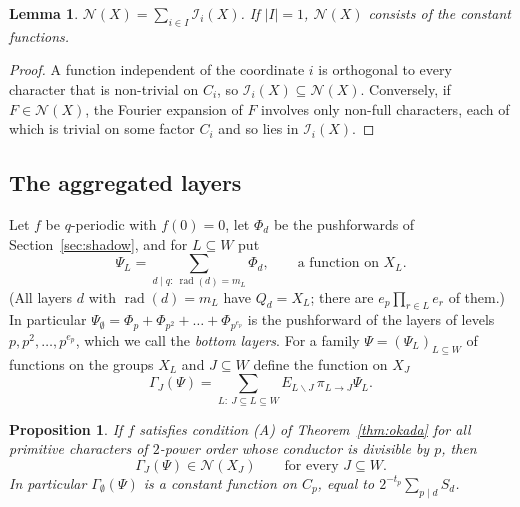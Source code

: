 \documentclass[11pt]{amsart}
\newtheorem{lemma}[theorem]{Lemma}
\newtheorem{proposition}[theorem]{Proposition}
\theoremstyle{definition}
\theoremstyle{remark}
\newcommand{\Nn}{\mathcal N}
\DeclareMathOperator{\rad}{rad}
\numberwithin{equation}{section}
\begin{document}
\begin{lemma}\label{lem:N}
$\Nn(X)=\sum_{i\in I}\mathcal I_i(X)$.
If $|I|=1$, $\Nn(X)$ consists of the constant functions.
\end{lemma}

\begin{proof}
A function independent of the coordinate $i$ is orthogonal to every character that is non-trivial on $C_i$, so $\mathcal I_i(X)\subseteq\Nn(X)$.
Conversely, if $F\in\Nn(X)$, the Fourier expansion of $F$ involves only non-full characters, each of which is trivial on some factor $C_i$ and so lies in $\mathcal I_i(X)$.
\end{proof}

\subsection{The aggregated layers}
Let $f$ be $q$-periodic with $f(0)=0$, let $\Phi_d$ be the pushforwards of Section~\ref{sec:shadow}, and for $L\subseteq W$ put
\[
\Psi_L=\sum_{d\mid q:\ \rad(d)=m_L}\Phi_d,\qquad\text{a function on }X_L .
\]
(All layers $d$ with $\rad(d)=m_L$ have $Q_d=X_L$; there are $e_p\prod_{r\in L}e_r$ of them.)
In particular $\Psi_\emptyset=\Phi_p+\Phi_{p^2}+\dots+\Phi_{p^{e_p}}$ is the pushforward of the layers of levels $p,p^2,\dots,p^{e_p}$, which we call the \emph{bottom layers}.
For a family $\Psi=(\Psi_L)_{L\subseteq W}$ of functions on the groups $X_L$ and $J\subseteq W$ define the function on $X_J$
\begin{equation}\label{eq:Gamma}
\Gamma_J(\Psi)=\sum_{L:\ J\subseteq L\subseteq W}E_{L\smallsetminus J}\,\pi_{L\to J}\Psi_L .
\end{equation}

\begin{proposition}\label{prop:subsystem}
If $f$ satisfies condition \textup{(A)} of Theorem~\ref{thm:okada} for all primitive characters of $2$-power order whose conductor is divisible by $p$, then
\[
\Gamma_J(\Psi)\in\Nn(X_J)\qquad\text{for every }J\subseteq W .
\]
In particular $\Gamma_\emptyset(\Psi)$ is a constant function on $C_p$, equal to $2^{-t_p}\sum_{p\mid d}S_d$.
\end{proposition}
\end{document}
